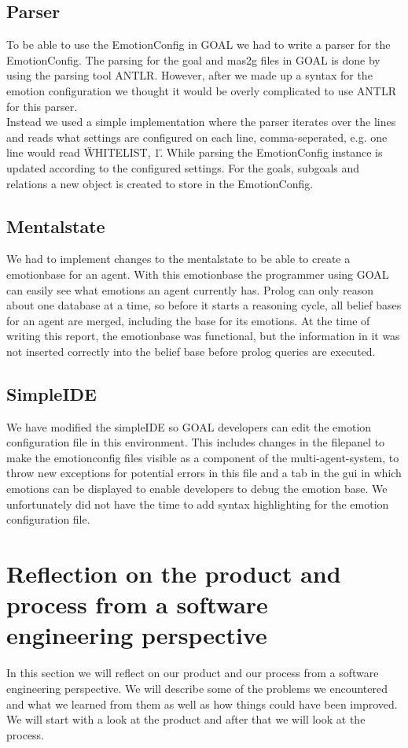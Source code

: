 \documentclass[11pt]{article}
\begin{document}
\subsection{Parser}
To be able to use the EmotionConfig in GOAL we had to write a parser for the EmotionConfig. The parsing for the goal and mas2g files in GOAL is done by using the parsing tool ANTLR. However, after we made up a syntax for the emotion configuration we thought it would be overly complicated to use ANTLR for this parser.\\
Instead we used a simple implementation where the parser iterates over the lines and reads what settings are configured on each line, comma-seperated, e.g. one line would read \"WHITELIST, 1\". While parsing the EmotionConfig instance is updated according to the configured settings. For the goals, subgoals and relations a new object is created to store in the EmotionConfig. 

\subsection{Mentalstate}
We had to implement changes to the mentalstate to be able to create a emotionbase for an agent. With this emotionbase the programmer using GOAL can easily see what emotions an agent currently has. Prolog can only reason about one database at a time, so before it starts a reasoning cycle, all belief bases for an agent are merged, including the base for its emotions. At the time of writing this report, the emotionbase was functional, but the information in it was not inserted correctly into the belief base before prolog queries are executed. 

\subsection{SimpleIDE}
We have modified the simpleIDE so GOAL developers can edit the emotion configuration file in this environment. This includes changes in the filepanel to make the emotionconfig files visible as a component of the multi-agent-system\cite{GOAL Env}, to throw new exceptions for potential errors in this file and a tab in the gui in which emotions can be displayed to enable developers to debug the emotion base. We unfortunately did not have the time to add syntax highlighting for the emotion configuration file. 

\section{Reflection on the product and process from a software engineering perspective}
In this section we will reflect on our product and our process from a software engineering perspective. We will describe some of the problems we encountered and what we learned from them as well as how things could have been improved. We will start with a look at the product and after that we will look at the process.
\end{document}
